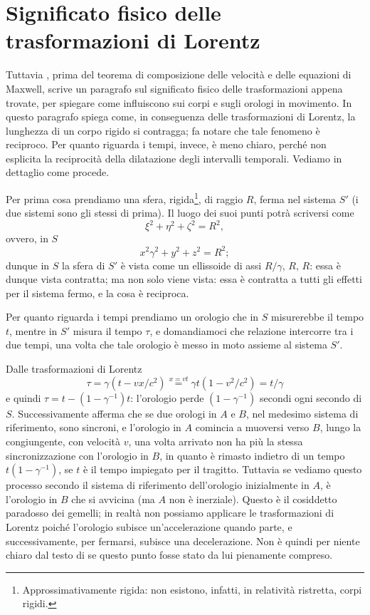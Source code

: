 \section{Significato fisico delle trasformazioni di Lorentz}
Tuttavia \ein, prima del teorema di composizione delle velocit\`a e
delle equazioni di Maxwell, scrive un paragrafo sul significato fisico
delle trasformazioni appena trovate, per spiegare come influiscono sui
corpi e sugli orologi in movimento. In questo paragrafo spiega come, in
conseguenza delle trasformazioni di Lorentz, la lunghezza di un corpo
rigido si contragga; fa notare che tale fenomeno \`e reciproco. Per
quanto riguarda i tempi, invece, \ein{} \`e meno chiaro, perch\'e non
esplicita la reciprocit\`a della dilatazione degli intervalli
temporali. Vediamo in dettaglio come procede.

Per prima cosa prendiamo una sfera, rigida\footnote{Approssimativamente
rigida: non esistono, infatti, in relativit\`a ristretta, corpi
rigidi.}, di raggio $R$, ferma nel sistema $S'$ (i due sistemi sono gli
stessi di prima). Il luogo dei suoi punti potr\`a scriversi come
\begin{equation}
  \xi^{2} + \eta^{2} + \zeta^{2} = R^{2},
\end{equation}
ovvero, in $S$
\begin{equation}
  x^{2} \gamma^{2} + y^{2} + z^{2} = R^{2};
\end{equation}
dunque in $S$ la sfera di $S'$ \`e vista come un ellissoide di assi 
$R / \gamma,\, R,\, R$: essa \`e dunque vista contratta; ma non solo
viene vista: essa \`e contratta a tutti gli effetti per il sistema
fermo, e la cosa \`e reciproca.

Per quanto riguarda i tempi prendiamo un orologio che in $S$
misurerebbe il tempo $t$, mentre in $S'$ misura il tempo $\tau$, e
domandiamoci che relazione intercorre tra i due tempi, una volta che
tale orologio \`e messo in moto assieme al sistema $S'$.

Dalle trasformazioni di Lorentz
\begin{equation}
  \tau = \gamma (t - v x /c^{2}) \stackrel{x = vt}{=} 
  \gamma t (1 - v^{2}/c^{2}) = t / \gamma 
\end{equation}
e quindi $\tau = t - (1 - \gamma^{-1}) t$: l'orologio perde $(1 -
\gamma^{-1})$ secondi ogni secondo di $S$.  Successivamente afferma che
se due orologi in $A$ e $B$, nel medesimo sistema di riferimento, sono
sincroni, e l'orologio in $A$ comincia a muoversi verso $B$, lungo la
congiungente, con velocit\`a $v$, una volta arrivato non ha pi\`u la
stessa sincronizzazione con l'orologio in $B$,\label{err_tempi} in
quanto \`e rimasto indietro di un tempo $t ( 1 - \gamma^{-1})$, se $t$
\`e il tempo impiegato per il tragitto. Tuttavia se vediamo questo
processo secondo il sistema di riferimento dell'orologio inizialmente in
$A$, \`e l'orologio in $B$ che si avvicina (ma $A$ non \`e
inerziale). Questo \`e il cosiddetto paradosso dei gemelli; in realt\`a
non possiamo applicare le trasformazioni di Lorentz poich\'e l'orologio
subisce un'accelerazione quando parte, e successivamente, per fermarsi,
subisce una decelerazione. Non \`e quindi per niente chiaro dal testo di
\ein{} se questo punto fosse stato da lui pienamente compreso.
